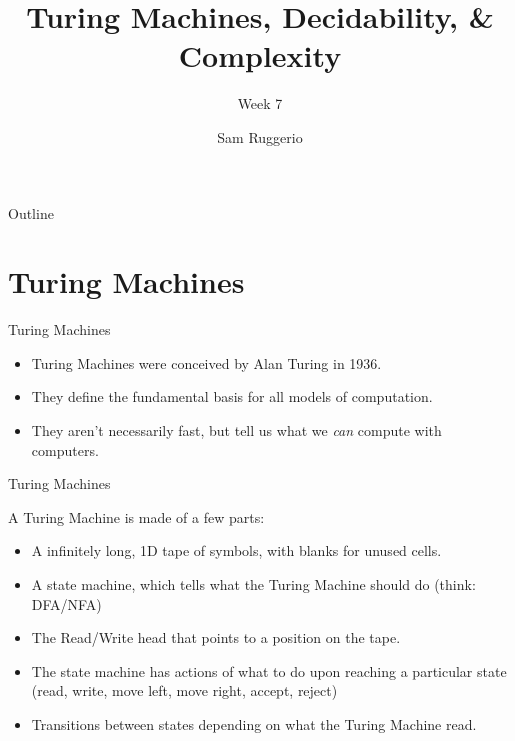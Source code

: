 \documentclass[aspectratio=169, handout]{beamer}
\title{Turing Machines, Decidability, \& Complexity}
\subtitle{Week \texorpdfstring{7}{Lg}}
\author{Sam Ruggerio}
\date{}
\begin{document}
\begin{frame}
\titlepage
\end{frame}

\begin{frame}{Outline}
  \tableofcontents
\end{frame}

\section{Turing Machines}
\frame{\sectionpage}
\begin{frame}{Turing Machines}

\begin{itemize}
    \item Turing Machines were conceived by Alan Turing in 1936.
    
    \item They define the fundamental basis for all models of computation.
    
    \item They aren't necessarily fast,  but tell us what we \textit{can} compute with computers. 
\end{itemize}

\end{frame}

\begin{frame}{Turing Machines}

A Turing Machine is made of a few parts: \pause
\begin{itemize}
    \item A infinitely long, 1D tape of symbols, with blanks for unused cells. \pause
    \item A state machine, which tells what the Turing Machine should do (think: DFA/NFA) \pause
    \item The Read/Write head that points to a position on the tape.
    \item The state machine has actions of what to do upon reaching a particular state (read, write, move left, move right, accept, reject) \pause
    \item Transitions between states depending on what the Turing Machine read.
\end{itemize}
\end{frame}
\end{document}
